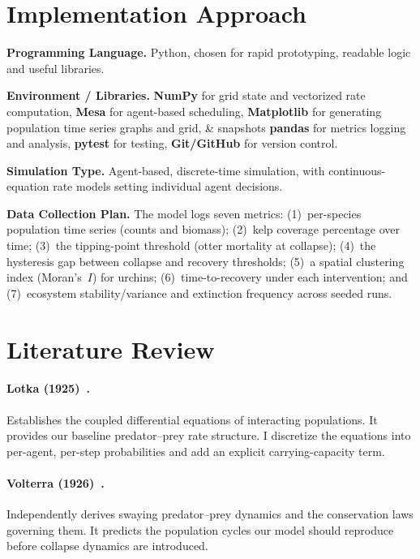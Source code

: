 \documentclass[manuscript,nonacm,11pt]{acmart}
\begin{document}
\section{Implementation Approach}

\textbf{Programming Language.} Python, chosen for rapid
prototyping, readable logic and useful libraries.

\textbf{Environment / Libraries.} \textbf{NumPy} for grid state and vectorized
rate computation, \textbf{Mesa} for agent-based scheduling, \textbf{Matplotlib}
for generating population time series graphs and grid, \& snapshots
\textbf{pandas} for metrics logging and analysis, \textbf{pytest} for
testing, \textbf{Git/GitHub} for version control.

\textbf{Simulation Type.} Agent-based, discrete-time simulation, with
continuous-equation rate models setting individual agent decisions.

\textbf{Data Collection Plan.} The model logs seven metrics: (1)~per-species
population time series (counts and biomass); (2)~kelp coverage percentage over
time; (3)~the tipping-point threshold (otter mortality at collapse);
(4)~the hysteresis gap between collapse and recovery thresholds; (5)~a spatial
clustering index (Moran's~$I$) for urchins; (6)~time-to-recovery under each
intervention; and (7)~ecosystem stability/variance and extinction frequency
across seeded runs.

\section{Literature Review}

\paragraph{Lotka (1925)~\cite{lotka1925}.} Establishes the coupled
differential equations of interacting populations.
It provides our baseline predator--prey rate structure. I discretize 
the equations into per-agent, per-step probabilities and add an explicit
carrying-capacity term.

\paragraph{Volterra (1926)~\cite{volterra1926}.} Independently derives
swaying predator--prey dynamics and the conservation laws governing them.
It predicts the population cycles our model should reproduce
before collapse dynamics are introduced. 
\end{document}
